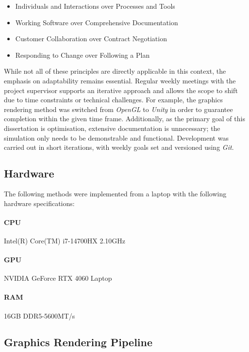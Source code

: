 \documentclass[a4paper, 12pt]{article}
\begin{document}
    \begin{itemize}
        \item Individuals and Interactions over Processes and Tools
        \item Working Software over Comprehensive Documentation
        \item Customer Collaboration over Contract Negotiation
        \item Responding to Change over Following a Plan
    \end{itemize}

    While not all of these principles are directly applicable in this context, the emphasis on adaptability remains essential. Regular weekly meetings with the project supervisor supports an iterative approach and allows the scope to shift due to time constraints or technical challenges. For example, the graphics rendering method was switched from \textit{OpenGL} to \textit{Unity} in order to guarantee completion within the given time frame. Additionally, as the primary goal of this dissertation is optimisation, extensive documentation is unnecessary; the simulation only needs to be demonstrable and functional. Development was carried out in short iterations, with weekly goals set and versioned using \textit{Git}.

    \subsection{Hardware}

    The following methods were implemented from a laptop with the following hardware specifications:

    \paragraph{CPU} Intel(R) Core(TM) i7-14700HX 2.10GHz
    \paragraph{GPU} NVIDIA GeForce RTX 4060 Laptop
    \paragraph{RAM} 16GB DDR5-5600MT/s

    \subsection{Graphics Rendering Pipeline}
\end{document}
